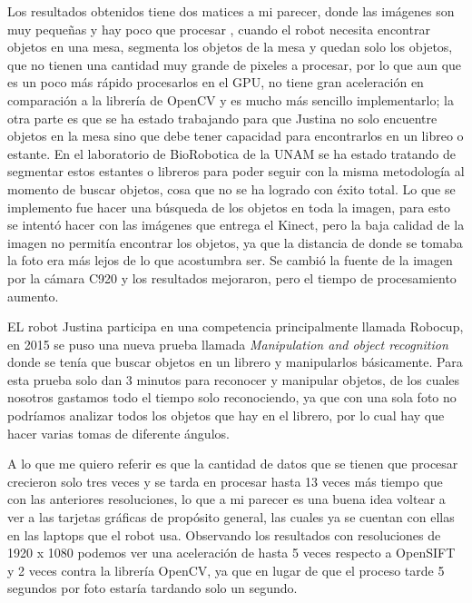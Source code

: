  
 Los resultados obtenidos tiene dos matices a mi parecer, donde las imágenes son muy pequeñas y hay poco que procesar , cuando el robot necesita encontrar objetos en una mesa, segmenta los objetos de la mesa y quedan solo los objetos, que no tienen una cantidad muy grande de pixeles a procesar, por lo que aun que es un poco más rápido procesarlos en el GPU, no tiene gran aceleración en comparación a la librería de OpenCV y es mucho más sencillo implementarlo; la otra parte es que se ha estado trabajando para que Justina no solo encuentre objetos en la mesa sino que debe tener capacidad para encontrarlos en un libreo o estante. En el laboratorio de BioRobotica de la UNAM  se ha estado tratando de segmentar estos estantes o libreros para poder seguir con la misma metodología al momento de buscar objetos, cosa que no se ha logrado con éxito total. Lo que se implemento fue hacer una búsqueda de los objetos en toda la imagen, para esto se intentó hacer con las imágenes que entrega el Kinect, pero la baja calidad de la imagen no permitía encontrar los objetos, ya que la distancia de donde se tomaba la foto era más lejos de lo que acostumbra ser.
 Se cambió la fuente de la imagen por la cámara C920 y los resultados mejoraron, pero el tiempo de procesamiento aumento.

EL robot Justina participa en una competencia principalmente llamada Robocup, en 2015 se puso una nueva prueba llamada  \textit{Manipulation and object recognition} donde se tenía que buscar objetos en un librero y manipularlos básicamente. Para esta prueba solo dan 3 minutos para reconocer y manipular objetos,  de los cuales nosotros gastamos todo el tiempo solo reconociendo, ya que con una sola foto no podríamos analizar todos los objetos que  hay en el librero, por lo cual hay que hacer varias tomas de diferente ángulos.


 
 A lo que me quiero referir es que la cantidad de datos que se tienen que procesar crecieron solo tres veces y se tarda en procesar hasta 13 veces más tiempo que con las anteriores resoluciones, lo que a mi parecer es una buena idea voltear a ver a las tarjetas gráficas de propósito general, las cuales ya se cuentan con ellas en las laptops que el robot usa. Observando los resultados con resoluciones de 1920 x 1080 podemos ver una aceleración de hasta 5 veces respecto a OpenSIFT y 2 veces contra la librería OpenCV, ya que en lugar de que el proceso tarde 5 segundos por foto estaría tardando solo un segundo.  
 
  

\nocite{AI Shack}


 
 

